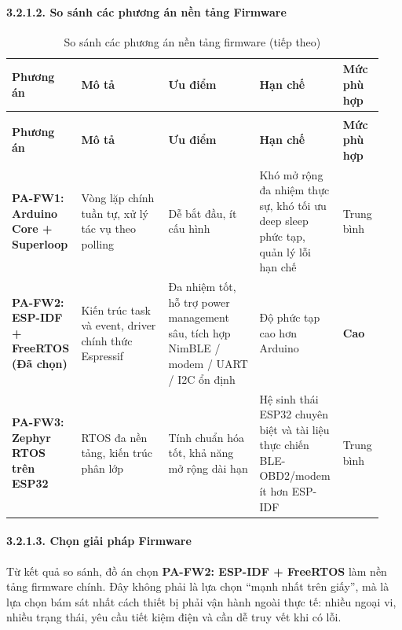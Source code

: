 \documentclass[a4paper]{extarticle}
\newcommand{\thesissettableid}[2]{%
  \renewcommand{\thetable}{#1}%
  \renewcommand{\theHtable}{#2}%
}
\begin{document}
\paragraph{3.2.1.2. So sánh các phương án nền tảng
Firmware}\label{3122-so-suxe1nh-cuxe1c-phux1b0ux1a1ng-uxe1n-nux1ec1n-tux1ea3ng-firmware}


{\thesissettableid{3.5A}{tab-ch3-so-sanh-cac-phuong-an-nen-tang-firmware}
\def\LTcaptype{table}
\begin{longtable}{|L{0.138\linewidth}|L{0.236\linewidth}|L{0.246\linewidth}|L{0.224\linewidth}|L{0.100\linewidth}|}
\caption{So sánh các phương án nền tảng firmware}\label{tab:ch3-so-sanh-cac-phuong-an-nen-tang-firmware}\\
\hline \textbf{Phương án} & \textbf{Mô tả} & \textbf{Ưu điểm} & \textbf{Hạn chế} & \textbf{Mức phù hợp} \\
\hline
\endfirsthead
\caption[]{So sánh các phương án nền tảng firmware (tiếp theo)}\\
\hline \textbf{Phương án} & \textbf{Mô tả} & \textbf{Ưu điểm} & \textbf{Hạn chế} & \textbf{Mức phù hợp} \\
\hline
\endhead
\hline
\endfoot
\endlastfoot
\textbf{PA-FW1: Arduino Core + Superloop} & Vòng lặp chính tuần tự, xử
lý tác vụ theo polling & Dễ bắt đầu, ít cấu hình & Khó mở rộng đa nhiệm
thực sự, khó tối ưu deep sleep phức tạp, quản lý lỗi hạn chế & Trung
bình \\\hline
\textbf{PA-FW2: ESP-IDF + FreeRTOS (Đã chọn)} & Kiến trúc task và event,
driver chính thức Espressif & Đa nhiệm tốt, hỗ trợ power management sâu,
tích hợp NimBLE / modem / UART / I2C ổn định & Độ phức tạp cao hơn Arduino &
\textbf{Cao} \\\hline
\textbf{PA-FW3: Zephyr RTOS trên ESP32} & RTOS đa nền tảng, kiến trúc
phân lớp & Tính chuẩn hóa tốt, khả năng mở rộng dài hạn & Hệ sinh thái
ESP32 chuyên biệt và tài liệu thực chiến BLE-OBD2/modem ít hơn ESP-IDF &
Trung bình \\\hline
\end{longtable}
}


\paragraph{3.2.1.3. Chọn giải pháp
Firmware}\label{3123-chux1ecdn-giux1ea3i-phuxe1p-firmware}

Từ kết quả so sánh, đồ án chọn \textbf{PA-FW2: ESP-IDF + FreeRTOS} làm
nền tảng firmware chính. Đây không phải là lựa chọn ``mạnh nhất trên giấy'',
mà là lựa chọn bám sát nhất cách thiết bị phải vận hành ngoài thực tế:
nhiều ngoại vi, nhiều trạng thái, yêu cầu tiết kiệm điện và cần dễ truy
vết khi có lỗi.
\end{document}
